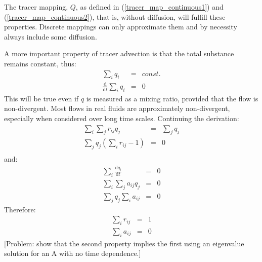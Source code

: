 \documentclass[12pt]{article}
\begin{document}
The tracer mapping, $Q$, as defined in 
(\ref{tracer_map_continuous1}) and (\ref{tracer_map_continuous2}),
that is, without diffusion, will fulfill these properties.  Discrete mappings
can only approximate them and by necessity always include some diffusion.

A more important property of tracer advection is that the total substance
remains constant, thus:
\begin{eqnarray}
\sum_i q_i & = & const. \\
\frac{\mathrm d}{\mathrm d t}\sum_i q_i & = & 0
\end{eqnarray}
This will be true even if $q$ is measured as a mixing ratio, provided that
the flow is non-divergent.  Most flows in real fluids are approximately 
non-divergent, especially when considered over long time scales.
Continuing the derivation:
\begin{eqnarray}
\sum_i \sum_j r_{ij} q_j & = & \sum_j q_j \\
\sum_j q_j \left ( \sum_i r_{ij} - 1 \right ) & = & 0 \\
\end{eqnarray}
and:
\begin{eqnarray}
\sum_i \frac{\mathrm d q_i}{\mathrm d t} & = & 0 \\
\sum_i \sum_j a_{ij} q_j & = & 0 \\
\sum_j q_j \sum_i a_{ij} & = & 0 
\end{eqnarray}
Therefore:
\begin{eqnarray}
\sum_i r_{ij} & = & 1 
\label{column_sums_to_one}\\
\sum_i a_{ij} & = & 0
\end{eqnarray}
[Problem: show that the second property implies the first using an eigenvalue
solution for an A with no time dependence.]
\end{document}
